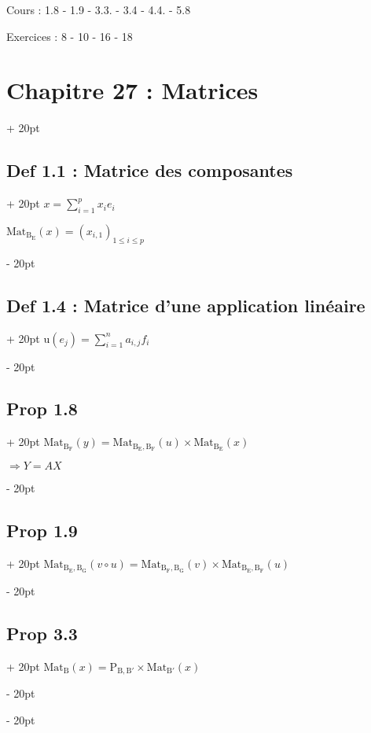 \documentclass[12pt]{article}
\newcommand{\ind}[1][20pt]{\advance\leftskip + #1}
\newcommand{\deind}[1][20pt]{\advance\leftskip - #1}
\newenvironment{indt}[2][20pt]{#2 \par \ind[#1]}{\par \deind}
\begin{document}
    Cours : 1.8 - 1.9 - 3.3. - 3.4 - 4.4. - 5.8

    Exercices : 8 - 10 - 16 - 18

    \begin{indt}{\section*{Chapitre 27 : Matrices}}
        \begin{indt}{\subsection*{Def 1.1 : Matrice des composantes}}
            $\displaystyle x=\sum_{i=1}^p x_i e_i$

            $\mathrm{Mat_{B_E}}(x)=(x_{i,1})_{1\le i\le p}$
        \end{indt}

        \begin{indt}{\subsection*{Def 1.4 : Matrice d'une application linéaire}}
            $\displaystyle \mathrm{u}(e_j)=\sum_{i=1}^n a_{i,j} f_i$
        \end{indt}

        \begin{indt}{\subsection*{Prop 1.8}}
            $\mathrm{Mat_{B_F}}(y)=\mathrm{Mat_{B_E,B_F}}(u)\times\mathrm{Mat_{B_E}}(x)$

            $\Rightarrow Y=AX$
        \end{indt}

        \begin{indt}{\subsection*{Prop 1.9}}
            $\mathrm{Mat_{B_E,B_G}}(v\circ u)=\mathrm{Mat_{B_F,B_G}}(v)\times\mathrm{Mat_{B_E,B_F}}(u)$
        \end{indt} 

        \begin{indt}{\subsection*{Prop 3.3}}
            $\mathrm{Mat_{B}}(x)=\mathrm{P_{B,B'}}\times\mathrm{Mat_{B'}}(x)$


\end{indt}
\end{indt}
\end{document}
